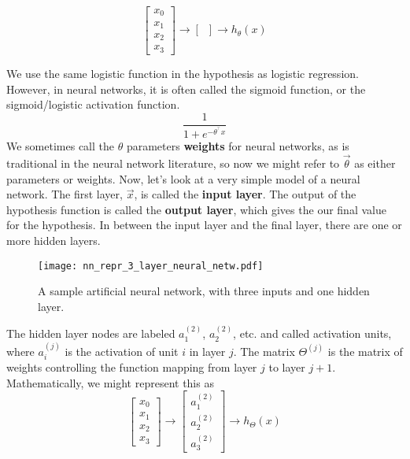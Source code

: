 $$
\left[\begin{array}{c} x_0 \\ x_1 \\ x_2 \\ x_3 \end{array}\right] \to \left[ {\;\;} \right] \to h_\theta\left(x\right)
$$

We use the same logistic function in the hypothesis as logistic regression. However, in neural networks, it is often called the sigmoid function, or the sigmoid/logistic activation function. 
\begin{equation}
\frac{1}{1 + e^{-\theta^{{}^\intercal} x}}
\end{equation}
We sometimes call the $\theta$ parameters \textbf{weights} for neural networks, as is traditional in the neural network literature, so now we might refer to $\vec{\theta}$ as either parameters or weights. Now, let's look at a very simple model of a neural network. The first layer, $\vec{x}$, is called the \textbf{input layer}. The output of the hypothesis function is called the \textbf{output layer}, which gives the our final value for the hypothesis. In between the input layer and the final layer, there are one or more hidden layers.
\begin{figure}[h] %
	\centering
	\graphicspath{{./Figures/}} %
	\texttt{[image: nn\_repr\_3\_layer\_neural\_netw.pdf]} 
	\caption[]{A sample artificial neural network, with three inputs and one hidden layer.}
	\label{nn_repr_3_layer_neural_netw.pdf}
\end{figure}
The hidden layer nodes are labeled $a_1^{(2)}$, $a_2^{(2)}$, etc. and called activation units, where $a_i^{(j)}$ is the activation of unit $i$ in layer $j$. The matrix $\Theta^{(j)}$ is the matrix of weights controlling the function mapping from layer $j$ to layer $j + 1$. Mathematically, we might represent this as
$$
\left[\begin{array}{c} x_0 \\ x_1 \\ x_2 \\ x_3 \end{array}\right] \to \left[\begin{array}{c} a_1^{(2)} \\ a_2^{(2)} \\ a_3^{(2)} \end{array}\right] \to h_\Theta\left(x\right)
$$

